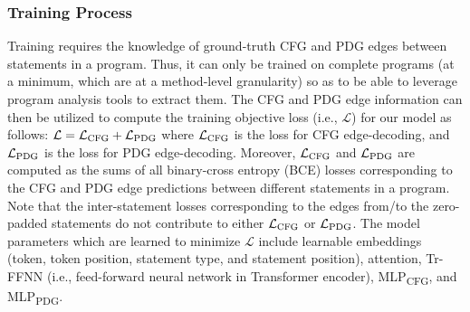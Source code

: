 \subsubsection{\bf Training Process}

Training \tool requires the knowledge of ground-truth CFG and PDG edges between statements in a program. Thus, it can only be trained on complete programs (at a minimum, which are at a method-level granularity) so as to be able to leverage program analysis tools to extract them. The CFG and PDG edge information can then be utilized to compute the training objective loss (i.e., $\mathcal{L}$) for our model as follows: $\mathcal{L} = \mathcal{L}\textsubscript{CFG} + \mathcal{L}\textsubscript{PDG}$
where $\mathcal{L}\textsubscript{CFG}$ is the loss for CFG edge-decoding, and $\mathcal{L}\textsubscript{PDG}$ is the loss for PDG edge-decoding. Moreover, $\mathcal{L}\textsubscript{CFG}$ and $\mathcal{L}\textsubscript{PDG}$ are computed as the sums of all binary-cross entropy (BCE) losses corresponding to the CFG and PDG edge predictions between different statements in a program. Note that the inter-statement losses corresponding to the edges from/to the zero-padded statements do not contribute to either $\mathcal{L}\textsubscript{CFG}$ or $\mathcal{L}\textsubscript{PDG}$. The model parameters which are learned to minimize $\mathcal{L}$ include learnable embeddings (token, token position, statement type, and statement position), attention, Tr-FFNN (i.e., feed-forward neural network in Transformer encoder), MLP\textsubscript{CFG}, and MLP\textsubscript{PDG}.


